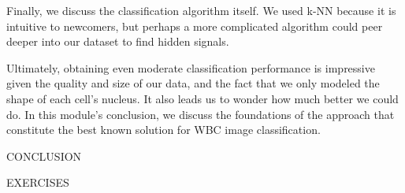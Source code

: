 \begin{qbox}\end{qbox}

Finally, we discuss the classification algorithm itself. We used k-NN because it is intuitive to newcomers, but perhaps a more complicated algorithm could peer deeper into our dataset to find hidden signals.

Ultimately, obtaining even moderate classification performance is impressive given the quality and size of our data, and the fact that we only modeled the shape of each cell's nucleus. It also leads us to wonder how much better we could do. In this module's conclusion, we discuss the foundations of the approach that constitute the best known solution for WBC image classification.

CONCLUSION

EXERCISES

\begin{exercise}\end{exercise}
